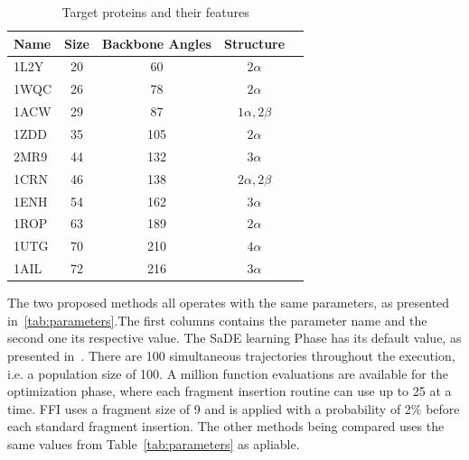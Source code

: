 \begin{table}[bh]
  \centering
  \begin{tabular}{ l | c | c | c | c }
    \hline \hline
    Name & Size & Backbone Angles & Structure         \\ \hline \hline
    1L2Y & 20   & 60              & $2\alpha$         \\ \hline
    1WQC & 26   & 78              & $2\alpha$         \\ \hline
    1ACW & 29   & 87              & $1\alpha, 2\beta$ \\ \hline
    1ZDD & 35   & 105             & $2\alpha$         \\ \hline
    2MR9 & 44   & 132             & $3\alpha$         \\ \hline
    1CRN & 46   & 138             & $2\alpha, 2\beta$ \\ \hline
    1ENH & 54   & 162             & $3\alpha$         \\ \hline
    1ROP & 63   & 189             & $2\alpha$         \\ \hline
    1UTG & 70   & 210             & $4\alpha$         \\ \hline
    1AIL & 72   & 216             & $3\alpha$         \\ \hline
    \hline
  \end{tabular}
  \caption{Target proteins and their features}
  \label{tab:protein-targets}
\end{table}



The two proposed methods all operates with the same parameters, as presented
in~\ref{tab:parameters}.The first columns contains the parameter name and the
second one its respective value. The SaDE learning Phase has its default value,
as presented in~\cite{qin2009differential}. There are 100 simultaneous
trajectories throughout the execution, i.e. a population size of 100. A million
function evaluations are available for the optimization phase, where each
fragment insertion routine can use up to 25 at a time. \ac{FFI} uses a fragment
size of 9 and is applied with a probability of 2\% before each standard fragment
insertion. The other methods being compared uses the same values from
Table~\ref{tab:parameters} as apliable.

